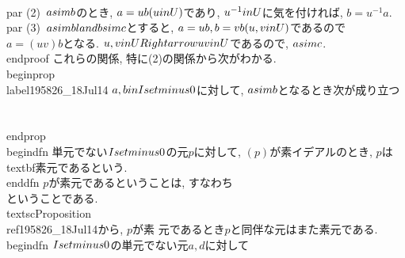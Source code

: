  \\par
 (2)~$a\\sim b$のとき, $a=ub(u\\in U)$であり, $u^{-1}\\in U$に気を付ければ,
 $b=u^{-1}a$.
 \\par
 (3)~$a\\sim b\\land b\\sim c$とすると, $a=ub, b=vb(u, v\\in U)$であるので
 $a=(uv)b$となる. $u, v\\in U\\Rightarrow uv\\in U$であるので, $a\\sim c$.
\\end{proof}
これらの関係, 特に(2)の関係から次がわかる.
\\begin{prop}
 \\label{195826_18Jul14}
 $a, b\\in I\\setminus \\{0\\}$に対して, $a\\sim b$となるとき次が成り立つ
 \\[
  d~|~b\\Rightarrow d~|~a
 \\]
 \\[
  a~|~m\\Rightarrow b~|~m
 \\]
\\end{prop}
\\begin{dfn}
 単元でない$I\\setminus \\{0\\}$の元$p$に対して, $(p)$が素イデアルのとき,
 $p$は\\textbf{素元}であるという. 
\\end{dfn}
$p$が素元であるということは, すなわち
\\[
 p~|~ab\\Rightarrow p~|~a \\text{または} p~|~b
\\]
ということである. \\textsc{Proposition}~\\ref{195826_18Jul14}から, $p$が素
元であるとき$p$と同伴な元はまた素元である.
\\begin{dfn}
 $I\\setminus \\{0\\}$の単元でない元$a, d$に対して
